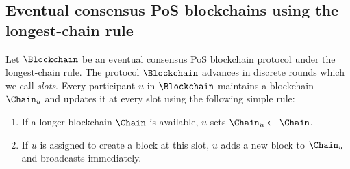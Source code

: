 \subsection{Eventual consensus PoS blockchains using the longest-chain rule}
    Let $\Blockchain$ be an eventual consensus PoS blockchain protocol 
    under the longest-chain rule. 
    The protocol $\Blockchain$ advances in discrete rounds 
    which we call \emph{slots}.
    Every participant $u$ in $\Blockchain$ 
    maintains a blockchain $\Chain_u$ 
    and updates it at every slot using the following simple rule: 
    \begin{enumerate}
      \item If a longer blockchain $\Chain$ is available, 
      $u$ sets $\Chain_u \leftarrow \Chain$.

      \item If $u$ is assigned to create a block at this slot, 
      $u$ adds a new block to $\Chain_u$ and broadcasts immediately.
    \end{enumerate}




